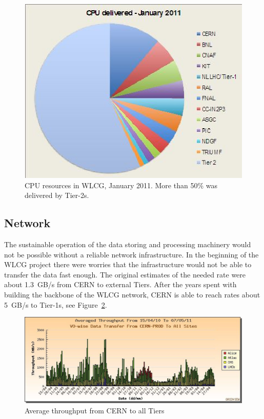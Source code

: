 \documentclass{intech}
\begin{document}
\begin{figure}[htb] %
\centering
\includegraphics[width=13cm]{fig06.eps} %
\caption{CPU resources in WLCG, January 2011. More than 50\% was
delivered by Tier-2s.}\label{fig06}
\end{figure}



\subsection{Network}
%
The sustainable operation of the data storing and processing
machinery would not be possible without a reliable network
infrastructure. In the beginning of the WLCG project there were
worries that the infrastructure would not be able to transfer the
data fast enough. The original estimates of the needed rate were
about 1.3~GB/s from CERN to external Tiers. After the years spent
with building the backbone of the WLCG network, CERN
is able to reach rates about 5~GB/s to Tier-1s, see
Figure~\ref{fig07}.

\begin{figure}[htb] %
\centering
\includegraphics[width=13cm]{fig07.eps} %
\caption{Average throughput from CERN to all Tiers}\label{fig07}
\end{figure}
\end{document}
